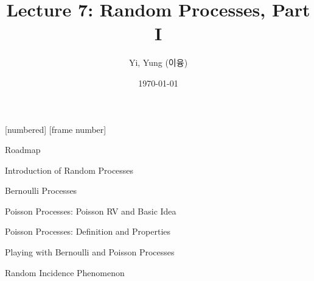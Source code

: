 

\csname\pdfmode\endcsname

{
  [numbered]
  [frame number]  %
}







\title[]{Lecture 7: Random Processes, Part I}
\author{Yi, Yung (이융)}
\date{\today}








\begin{frame}
  \titlepage
\end{frame}




\begin{frame}{Roadmap}

\plitemsep 0.2in

\bce[(1)]



\item Introduction of Random Processes
\item Bernoulli Processes
\item Poisson Processes: Poisson RV and Basic Idea

\item Poisson Processes: Definition and Properties

\item Playing with Bernoulli and Poisson Processes

\item Random Incidence Phenomenon

\ece

\end{frame}

